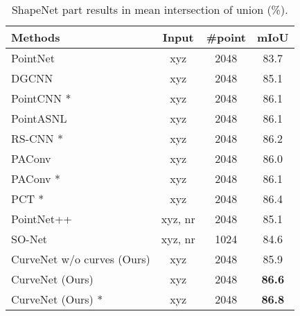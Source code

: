 \documentclass[10pt,twocolumn,letterpaper]{article}
\theoremstyle{definition}
\begin{document}
\begin{table} 
	\begin{center}
	\caption{ShapeNet part results in mean intersection of union (\%).}
		\begin{tabular}{l|ccc} 
			\toprule 
			Methods & Input & \#point & mIoU\\
			\hline
			\hline
			PointNet \cite{qi2017pointnet} & xyz & 2048 & 83.7\\
			DGCNN \cite{wang2019dynamic} & xyz & 2048  & 85.1 \\
PointCNN \cite{li2018pointcnn} * & xyz & 2048 & 86.1 \\ 
			PointASNL \cite{yan2020pointasnl} & xyz & 2048 & 86.1\\
			RS-CNN \cite{liu2019relation} *& xyz & 2048 & 86.2 \\
PAConv \cite{xu2021paconv} & xyz & 2048 & 86.0 \\
			PAConv \cite{xu2021paconv} * & xyz & 2048 & 86.1 \\
			PCT \cite{guo2020pct} * & xyz & 2048 & 86.4 \\
			
\hline
			PointNet++ \cite{qi2017pointnet++} & xyz, nr & 2048 & 85.1 \\
			SO-Net \cite{li2018so} & xyz, nr & 1024 & 84.6\\
			\hline
			CurveNet w/o curves (Ours) & xyz & 2048 & 85.9\\
			CurveNet (Ours)  & xyz & 2048 & \textbf{86.6}\\
			CurveNet (Ours) *& xyz & 2048  & \textbf{86.8}\\
			\bottomrule
		\end{tabular}
		
		\label{table:shapenet}

	\end{center}
	\vspace{-1em}
\end{table} 
\end{document}
